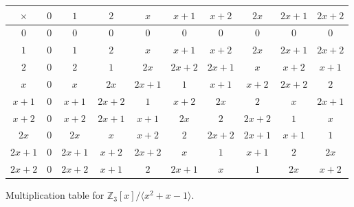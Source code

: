 \begin{solution}
    \begin{figure}[H]
      \centering
      \begin{tabular}{c|ccccccccc}
        $\times$ & $0$ & $1$ & $2$ & $x$ & $x+1$ & $x+2$ & $2x$ & $2x+1$ & $2x+2$ \\
        \hline
        $0$ & $0$ & $0$ & $0$ & $0$ & $0$ & $0$ & $0$ & $0$ & $0$ \\
        $1$ & $0$ & $1$ & $2$ & $x$ & $x+1$ & $x+2$ & $2x$ & $2x+1$ & $2x+2$ \\
        $2$ & $0$ & $2$ & $1$ & $2x$ & $2x+2$ & $2x+1$ & $x$ & $x+2$ & $x+1$ \\
        $x$ & $0$ & $x$ & $2x$ & $2x + 1$ & $1$ & $x+1$ & $x+2$ & $2x+2$ & $2$ \\
        $x+1$ & $0$ & $x+1$ & $2x+2$ & $1$ & $x+2$ & $2x$ & $2$ & $x$ & $2x+1$ \\
        $x+2$ & $0$ & $x+2$ & $2x+1$ & $x+1$ & $2x$ & $2$ & $2x+2$ & $1$ & $x$ \\
        $2x$ & $0$ & $2x$ & $x$ & $x+2$ & $2$ & $2x+2$ & $2x+1$ & $x+1$ & $1$ \\
        $2x+1$ & $0$ & $2x+1$ & $x+2$ & $2x+2$ & $x$ & $1$ & $x+1$ & $2$ & $2x$ \\
        $2x+2$ & $0$ & $2x+2$ & $x+1$ & $2$ & $2x+1$ & $x$ & $1$ & $2x$ & $x+2$ \\
      \end{tabular}
      \caption{Multiplication table for $\mathbb{Z}_3[x]/\langle x^2 + x - 1\rangle$.}
    \end{figure}
  \end{solution}

